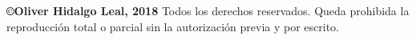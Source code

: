 \newpage
\thispagestyle{empty} %
\begin{flushleft}
\vspace*{\fill}
\textbf{©Oliver Hidalgo Leal,  2018}\newline
Todos los derechos reservados. Queda prohibida la reproducción total o parcial sin la autorización previa y por escrito.
\vspace*{1cm}
\end{flushleft}